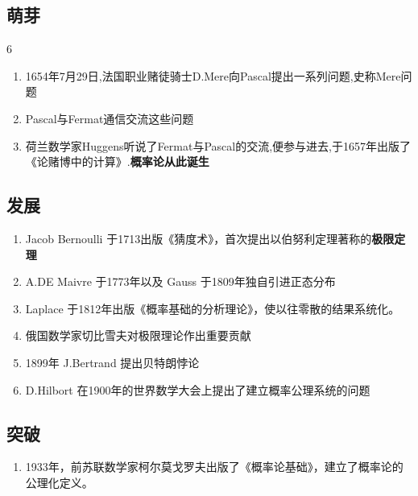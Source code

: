 \subsection*{萌芽}6

\begin{enumerate}
    \item 1654年7月29日,法国职业赌徒骑士D.Mere向Pascal提出一系列问题,史称Mere问题
    \item Pascal与Fermat通信交流这些问题
    \item 荷兰数学家Huggens听说了Fermat与Pascal的交流,便参与进去,于1657年出版了《论赌博中的计算》.\textbf{概率论从此诞生}
\end{enumerate}

\subsection*{发展}

\begin{enumerate}
    \item Jacob Bernoulli 于1713出版《猜度术》，首次提出以伯努利定理著称的\textbf{极限定理}
    \item A.DE Maivre 于1773年以及 Gauss 于1809年独自引进正态分布
    \item Laplace 于1812年出版《概率基础的分析理论》，使以往零散的结果系统化。
    \item 俄国数学家切比雪夫对极限理论作出重要贡献
    \item 1899年 J.Bertrand 提出贝特朗悖论
    \item D.Hilbort 在1900年的世界数学大会上提出了建立概率公理系统的问题
\end{enumerate}

\subsection*{突破}
\begin{enumerate}
    \item 1933年，前苏联数学家柯尔莫戈罗夫出版了《概率论基础》，建立了概率论的公理化定义。
\end{enumerate}